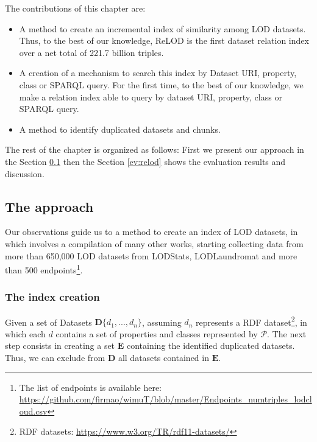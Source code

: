 The contributions of this chapter are:
\begin{itemize}
    \item A method to create an incremental index of similarity among LOD datasets. Thus, to the best of our knowledge, ReLOD is the first dataset relation index over a net total of 221.7 billion triples.
    \item A creation of a mechanism to search this index by Dataset URI, property, class or SPARQL query. For the first time, to the best of our knowledge, we make a relation index able to query by dataset URI, property, class or SPARQL query.
    \item A method to identify duplicated datasets and chunks.
\end{itemize}

The rest of the chapter is organized as follows:
First we present our approach in the Section \ref{sec:approach} then the Section \ref{ev:relod} shows the evaluation results and discussion.

\subsection{The approach}
\label{sec:approach}
Our observations guide us to a method to create an index of LOD datasets, in which involves a compilation of many other works, starting collecting data from more than 650,000 LOD datasets from LODStats, LODLaundromat and more than 500 endpoints\footnote{The list of endpoints is available here: \url{https://github.com/firmao/wimuT/blob/master/Endpoints_numtriples_lodcloud.csv}}. 


\subsubsection{The index creation}
\label{sec:indexCreation}

Given a set of Datasets $\mathbf{D}\{d_1,...,d_n\}$, assuming $d_n$ represents a RDF dataset\footnote{RDF datasets: \url{https://www.w3.org/TR/rdf11-datasets/}}, in which each $d$ contains a set of properties and classes represented by $\mathcal{P}$. The next step consists in creating a set $\mathbf{E}$ containing the identified duplicated datasets. Thus, we can exclude from $\mathbf{D}$ all datasets contained in $\mathbf{E}$.

